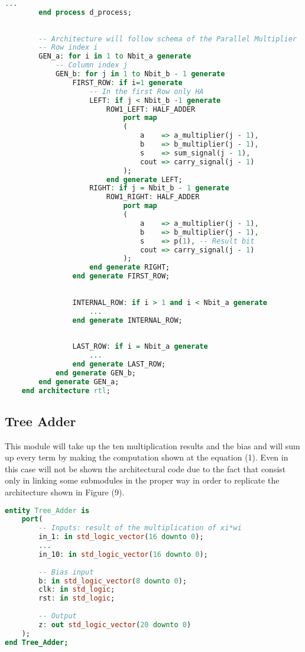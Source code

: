 \begin{lstlisting}[language=VHDL]
		...
		end process d_process;
		
		
		-- Architecture will follow schema of the Parallel Multiplier
		-- Row index i
		GEN_a: for i in 1 to Nbit_a generate
			-- Column index j
			GEN_b: for j in 1 to Nbit_b - 1 generate 
				FIRST_ROW: if i=1 generate
					-- In the first Row only HA
					LEFT: if j < Nbit_b -1 generate
						ROW1_LEFT: HALF_ADDER
							port map
							(
								a    => a_multiplier(j - 1), 
								b    => b_multiplier(j - 1), 
								s    => sum_signal(j - 1), 
								cout => carry_signal(j - 1) 
							);
						end generate LEFT;
					RIGHT: if j = Nbit_b - 1 generate
						ROW1_RIGHT: HALF_ADDER
							port map
							(
								a    => a_multiplier(j - 1), 
								b    => b_multiplier(j - 1), 
								s    => p(1), -- Result bit 
								cout => carry_signal(j - 1) 
							);
					end generate RIGHT; 
				end generate FIRST_ROW;
				
				
				INTERNAL_ROW: if i > 1 and i < Nbit_a generate
					...
				end generate INTERNAL_ROW;
				
				
				LAST_ROW: if i = Nbit_a generate
					...
				end generate LAST_ROW;
			end generate GEN_b;
		end generate GEN_a;
	end architecture rtl; 
\end{lstlisting}

\subsection{Tree Adder}
This module will take up the ten multiplication results and the bias and will sum up every term by making the computation shown at the equation (1). Even in this case will not be shown the architectural code due to the fact that consist only in linking some submodules in the proper way in order to replicate the architecture shown in Figure (9).
\begin{lstlisting}[language=VHDL]
entity Tree_Adder is
	port(
		-- Inputs: result of the multiplication of xi*wi
		in_1: in std_logic_vector(16 downto 0);
		...
		in_10: in std_logic_vector(16 downto 0);
		
		-- Bias input
		b: in std_logic_vector(8 downto 0);
		clk: in std_logic;
		rst: in std_logic;
		
		-- Output
		z: out std_logic_vector(20 downto 0)
	);
end Tree_Adder;

\end{lstlisting}


